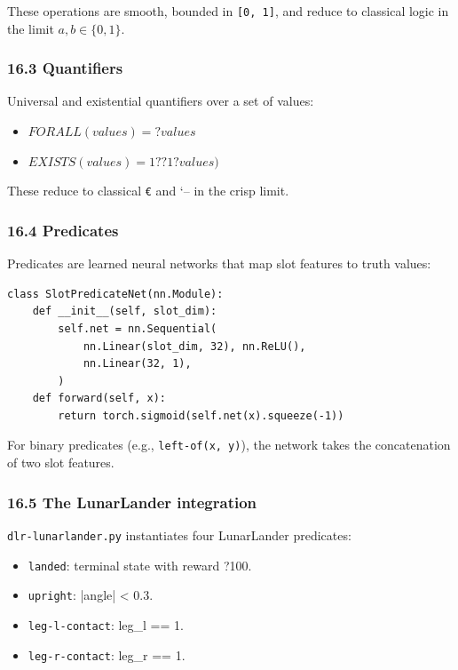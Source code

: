 \documentclass[11pt]{article}
\begin{document}
These operations are smooth, bounded in \texttt{[0, 1]}, and reduce to classical logic
in the limit $a,b \in \{0,1\}$.

\subsubsection{16.3 Quantifiers}

Universal and existential quantifiers over a set of values:

\begin{itemize}
  \item $FORALL(values) = ?values$
  \item $EXISTS(values) = 1 ??1 ?values)$
\end{itemize}


These reduce to classical \texttt{€} and `-- in the crisp limit.

\subsubsection{16.4 Predicates}

Predicates are learned neural networks that map slot features to truth values:

\begin{verbatim}
class SlotPredicateNet(nn.Module):
    def __init__(self, slot_dim):
        self.net = nn.Sequential(
            nn.Linear(slot_dim, 32), nn.ReLU(),
            nn.Linear(32, 1),
        )
    def forward(self, x):
        return torch.sigmoid(self.net(x).squeeze(-1))
\end{verbatim}

For binary predicates (e.g., \texttt{left-of(x, y)}), the network takes the
concatenation of two slot features.

\subsubsection{16.5 The LunarLander integration}

\texttt{dlr-lunarlander.py} instantiates four LunarLander predicates:

\begin{itemize}
  \item \texttt{landed}: terminal state with reward ?100.
  \item \texttt{upright}: |angle| < 0.3.
  \item \texttt{leg-l-contact}: leg\_l == 1.
  \item \texttt{leg-r-contact}: leg\_r == 1.
\end{itemize}
\end{document}
